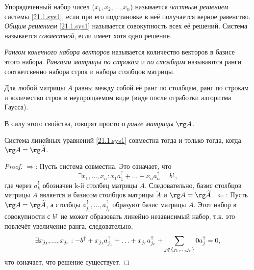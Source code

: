   \begin{defn}
  Упорядоченный набор чисел ($x_1, x_2, \ldots, x_n$) называется \textit{частным решением} системы \eqref{21.1.sys1}, если при его подстановке в неё получается верное равенство. \textit{Общим решением} \eqref{21.1.sys1} называется совокупность всех её решений. Система называется \textit{совместной}, если имеет хотя одно решение.
  \end{defn}
  \begin{defn}
  \textit{Рангом конечного набора векторов} называется количество векторов в базисе этого набора. \textit{Рангами матрицы по строкам} и \textit{по столбцам} называются ранги соответсвенно набора строк и набора столбцов матрицы.
  \end{defn}
  \begin{lemm} 
  Для любой матрицы $A$ равны между собой её ранг по столбцам, ранг по строкам и количество строк в неупрощаемом виде (виде после отработки алгоритма Гаусса).
  \end{lemm}
  В силу этого свойства, говорят просто о \textit{ранге матрицы} $\rg A$.
  \begin{thm}
  Система линейных уравнений \eqref{21.1.sys1} совместна тогда и только тогда, когда $\rg A = \rg \widetilde A$.
  \end{thm}
  \begin{proof}
  $\Rightarrow$: Пусть система совместна. Это означает, что
  \begin{equation*}
  \exists x_1,\ldots, x_n: x_1a_1^\uparrow +\ldots+x_na_n^\uparrow=b^\uparrow,
  \end{equation*}
  где через $a_k^\uparrow$ обозначен k-й столбец матрицы $A$. Следовательно, базис столбцов матрицы $A$  является и базисом столбцов матрицы $\widetilde A$ и $\rg A = \rg \widetilde A$.
  $\Leftarrow$: Пусть $\rg A = \rg \widetilde A$, а столбцы $a_{j_1}^\uparrow,...,a_{j_r}^\uparrow$ образуют базис матрицы $A$. Этот набор в совокупности с $b^\uparrow$ не может образовать линейно независимый набор, т.к. это повлечёт увеличение ранга, следовательно, 
  \begin{equation*}\\ 
  \exists x_{j_1},...,x_{j_r}: -b^\uparrow+x_{j_1}a_{j_1}^\uparrow+\ldots+x_{j_r}a_{j_r}^\uparrow+\sum_{j \notin \{j_1,...,j_r\}}0 a_j^\uparrow = 0,
  \end{equation*} 
  что означает, что решение существует.
  \end{proof}
